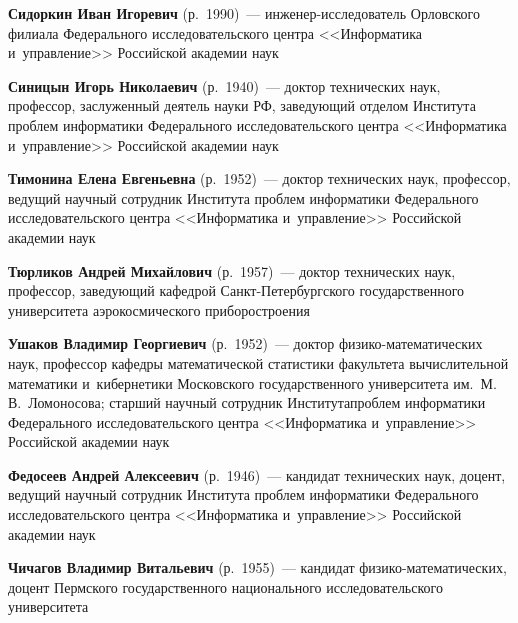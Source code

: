 \begin{multicols}{2}
\noindent
\textbf{Сидоркин Иван Игоревич} (р.\ 1990)~---
ин\-же\-нер-ис\-сле\-до\-ва\-тель Орловского филиала 
Федерального исследовательского центра 
<<Информатика и~управ\-ле\-ние>> Российской академии наук

\vspace*{3pt}

\noindent
  \textbf{Синицын Игорь Николаевич} (р.\ 1940)~--- доктор технических наук,
  профессор, заслуженный деятель науки РФ, заведующий отделом Института
  проб\-лем информатики Федерального исследовательского центра
  <<Информатика и~управ\-ле\-ние>> Российской академии наук
  
  \vspace*{3pt}

\noindent
\textbf{Тимонина Елена Евгеньевна} (р.\ 1952)~---
доктор технических наук, профессор, ведущий научный сотруд\-ник 
Института проб\-лем информатики Федерального исследовательского центра 
<<Информатика и~управ\-ле\-ние>> Российской академии наук

\columnbreak

\noindent
\textbf{Тюрликов Андрей Михайлович} (р.\ 1957)~---
доктор технических наук, профессор, заведующий ка\-фед\-рой  Санкт-Пе\-тер\-бург\-ско\-го 
государственного университета аэрокосмического приборостроения


\vspace*{3pt}

\noindent
\textbf{Ушаков Владимир Георгиевич} (р.\ 1952)~---
доктор фи\-зи\-ко-ма\-те\-ма\-ти\-че\-ских наук, профессор кафедры 
математической статистики факультета вычислительной математики и~кибернетики 
Московского государственного университета им.\ М.\,В.~Ломоносова;
старший научный сотрудник Института\linebreak проб\-лем информатики Федерального 
исследовательского центра <<Информатика и~управ\-ле\-ние>> Российской академии наук

\vspace*{3pt}

\noindent
\textbf{Федосеев Андрей Алексеевич} (р.\ 1946)~---
кандидат технических наук, доцент, ведущий научный сотрудник 
Института проб\-лем информатики Федерального исследовательского центра 
<<Информатика и~управ\-ле\-ние>> Российской академии наук

\vspace*{3pt}

\noindent
\textbf{Чичагов Владимир Витальевич} (р.\ 1955)~---
кандидат  фи\-зи\-ко-ма\-те\-ма\-ти\-че\-ских, доцент Пермского 
государственного национального исследовательского университета


\end{multicols}
